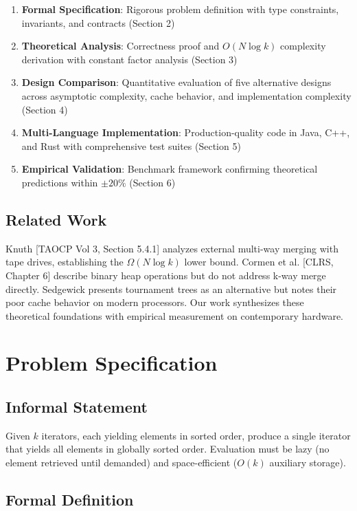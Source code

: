 \documentclass[11pt]{article}
\begin{document}
\begin{enumerate}
    \item \textbf{Formal Specification}: Rigorous problem definition with type constraints, invariants, and contracts (Section 2)
    \item \textbf{Theoretical Analysis}: Correctness proof and $O(N \log k)$ complexity derivation with constant factor analysis (Section 3)
    \item \textbf{Design Comparison}: Quantitative evaluation of five alternative designs across asymptotic complexity, cache behavior, and implementation complexity (Section 4)
    \item \textbf{Multi-Language Implementation}: Production-quality code in Java, C++, and Rust with comprehensive test suites (Section 5)
    \item \textbf{Empirical Validation}: Benchmark framework confirming theoretical predictions within $\pm 20\%$ (Section 6)
\end{enumerate}

\subsection{Related Work}

Knuth [TAOCP Vol 3, Section 5.4.1] analyzes external multi-way merging with tape drives, establishing the $\Omega(N \log k)$ lower bound. Cormen et al. [CLRS, Chapter 6] describe binary heap operations but do not address k-way merge directly. Sedgewick presents tournament trees as an alternative but notes their poor cache behavior on modern processors. Our work synthesizes these theoretical foundations with empirical measurement on contemporary hardware.

\section{Problem Specification}

\subsection{Informal Statement}

Given $k$ iterators, each yielding elements in sorted order, produce a single iterator that yields all elements in globally sorted order. Evaluation must be lazy (no element retrieved until demanded) and space-efficient ($O(k)$ auxiliary storage).

\subsection{Formal Definition}
\end{document}
